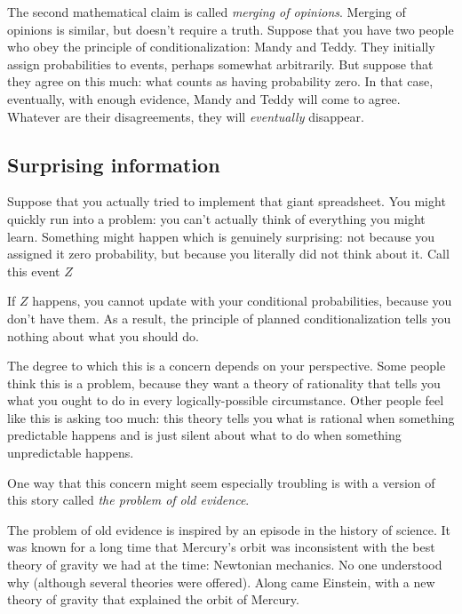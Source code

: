 The second mathematical claim is called {\it merging of opinions}. Merging of opinions is similar, but doesn't require a truth. Suppose that you have two people who obey the principle of conditionalization: Mandy and Teddy.  They initially assign probabilities to events, perhaps somewhat arbitrarily.  But suppose that they agree on this much: what counts as having probability zero.  In that case, eventually, with enough evidence, Mandy and Teddy will come to agree.  Whatever are their disagreements, they will {\it eventually} disappear.

\subsection{Surprising information}

Suppose that you actually tried to implement that giant spreadsheet. You might quickly run into a problem: you can't actually think of everything you might learn. Something might happen which is genuinely surprising: not because you assigned it zero probability, but because you literally did not think about it.  Call this event $Z$

If $Z$ happens, you cannot update with your conditional probabilities, because you don't have them.  As a result, the principle of planned conditionalization tells you nothing about what you should do.

The degree to which this is a concern depends on your perspective. Some people think this is a problem, because they want a theory of rationality that tells you what you ought to do in every logically-possible circumstance.  Other people feel like this is asking too much: this theory tells you what is rational when something predictable happens and is just silent about what to do when something unpredictable happens.

One way that this concern might seem especially troubling is with a version of this story called {\it the problem of old evidence}. 

The problem of old evidence is inspired by an episode in the history of science.  It was known for a long time that Mercury's orbit was inconsistent with the best theory of gravity we had at the time: Newtonian mechanics.  No one understood why (although several theories were offered).  Along came Einstein, with a new theory of gravity that explained the orbit of Mercury.  

